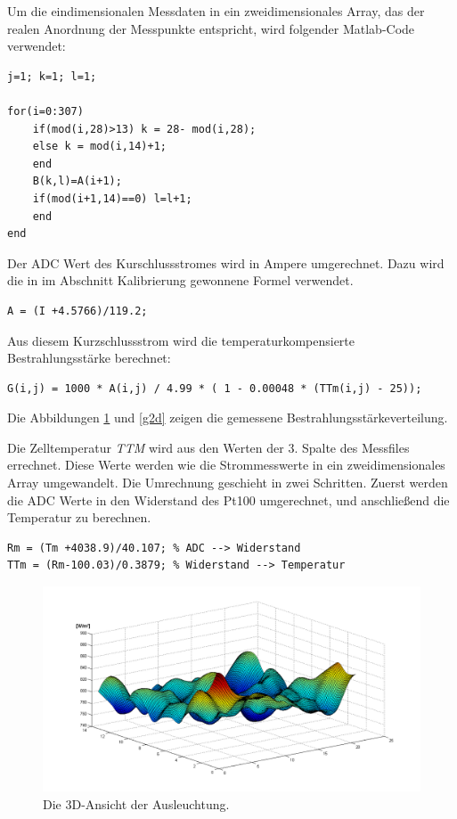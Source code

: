 \documentclass[a4paper,bibtotoc,oneside]{scrbook}
\begin{document}
\noindent Um die eindimensionalen Messdaten in ein zweidimensionales Array, das der realen Anordnung der Messpunkte entspricht, wird folgender Matlab-Code verwendet:
\begin{verbatim}
j=1; k=1; l=1;

for(i=0:307)
    if(mod(i,28)>13) k = 28- mod(i,28);
    else k = mod(i,14)+1;
    end
    B(k,l)=A(i+1);
    if(mod(i+1,14)==0) l=l+1;
    end
end
\end{verbatim}

\noindent Der ADC Wert des Kurschlussstromes wird in Ampere umgerechnet. Dazu wird die in im Abschnitt Kalibrierung gewonnene Formel verwendet.
\begin{verbatim}
A = (I +4.5766)/119.2; 
\end{verbatim}
Aus diesem Kurzschlussstrom wird die temperaturkompensierte Bestrahlungsstärke berechnet:
\begin{verbatim}
G(i,j) = 1000 * A(i,j) / 4.99 * ( 1 - 0.00048 * (TTm(i,j) - 25));
\end{verbatim}
Die Abbildungen \ref{g3d} und \ref{g2d} zeigen die gemessene Bestrahlungsstärkeverteilung.

\noindent Die Zelltemperatur \textit{TTM} wird aus den Werten der 3. Spalte des Messfiles errechnet. Diese Werte werden wie die Strommesswerte in ein zweidimensionales Array umgewandelt. Die Umrechnung geschieht in zwei Schritten. Zuerst werden die ADC Werte in den Widerstand des Pt100 umgerechnet, und anschließend die Temperatur zu berechnen.

\begin{verbatim}
Rm = (Tm +4038.9)/40.107; % ADC --> Widerstand
TTm = (Rm-100.03)/0.3879; % Widerstand --> Temperatur
\end{verbatim}



\begin{figure}[htbp]
\centering
\includegraphics[width=125mm]{img/g3d.png}
\caption{Die 3D-Ansicht der Ausleuchtung.}\label{g3d}
\end{figure}
\end{document}
